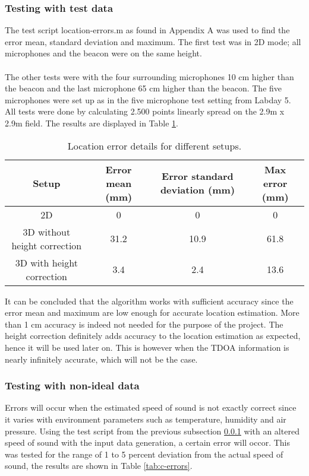 \documentclass[final]{scrreprt} %
\begin{document}
\subsubsection{Testing with test data}
\label{sec:testing}
The test script location-errors.m as found in Appendix A was used to find the error mean, standard deviation and maximum.
The first test was in 2D mode; all microphones and the beacon were on the same height.
\\ \\
The other tests were with the four surrounding microphones 10 cm higher than the beacon and the last microphone 65 cm higher than the beacon.
The five microphones were set up as in the five microphone test setting from Labday 5.
All tests were done by calculating 2.500 points linearly spread on the 2.9m x 2.9m field.
The results are displayed in Table \ref{tab:errors}.

\begin{table} [H]
\centering
	\begin{tabular}{ c | c | c | c }
  	Setup & Error mean (mm) & Error standard deviation (mm) & Max error (mm) \\ \hline
  	2D & 0 & 0 & 0 \\
  	3D without height correction & 31.2 & 10.9 & 61.8 \\
	3D with height correction & 3.4 & 2.4 & 13.6 \\
	\end{tabular}
\caption{Location error details for different setups.}
\label{tab:errors}
\end{table}

It can be concluded that the algorithm works with sufficient accuracy since the error mean and maximum are low enough for accurate location estimation.
More than 1 cm accuracy is indeed not needed for the purpose of the project.
The height correction definitely adds accuracy to the location estimation as expected, hence it will be used later on.
This is however when the TDOA information is nearly infinitely accurate, which will not be the case.

\subsubsection{Testing with non-ideal data}
Errors will occur when the estimated speed of sound is not exactly correct since it varies with environment parameters such as temperature, humidity and air pressure.
Using the test script from the previous subsection \ref{sec:testing} with an altered speed of sound with the input data generation, a certain error will occor.
This was tested for the range of 1 to 5 percent deviation from the actual speed of sound, the results are shown in Table \ref{tab:c-errors}.
\end{document}

